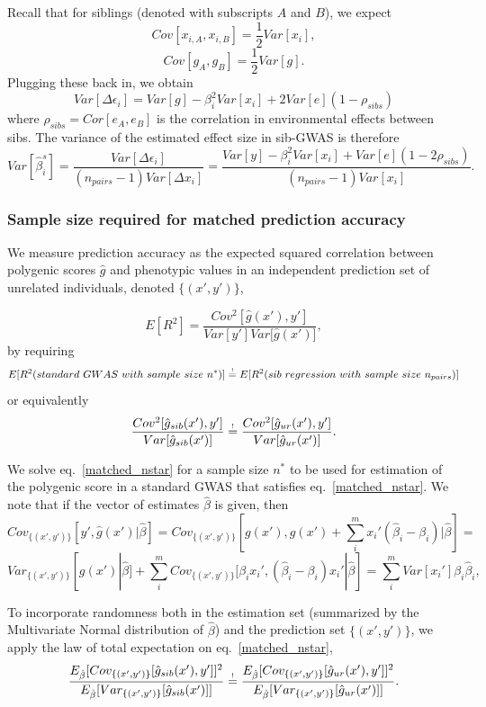 \documentclass[hidelinks, 12pt]{article}
\begin{document}
Recall that for siblings (denoted with subscripts $A$ and $B$), we expect
$$Cov[x_{i,A},x_{i,B}]=\frac{1}{2}Var[x_i],$$
$$Cov[g_A,g_B]=\frac{1}{2}Var[g].$$
Plugging these back in, we obtain
$$Var[\Delta \epsilon_i] = Var[g] - \beta_i^2Var[x_i] + 2Var[e](1-\rho_{sibs}) $$
where $\rho_{sibs} = Cor[e_A,e_B]$ is the correlation in environmental effects between sibs. The variance of the estimated effect size in sib-GWAS is therefore
\begin{equation}
\label{var_beta_hat_sibs}
Var[\hat{\beta}^{s}_i]=\frac{Var[\Delta \epsilon_i]}{(n_{pairs}-1) Var[\Delta x_i]} = \frac{Var[y] - \beta_i^2Var[x_i] + Var[e](1-2\rho_{sibs})}{(n_{pairs}-1) Var[x_i]}.
\end{equation}


\subsubsection{Sample size required for matched prediction accuracy}

We measure prediction accuracy as the expected squared correlation between polygenic scores $\hat{g}$ and phenotypic values in an independent prediction set of unrelated individuals, denoted $\{(x',y')\}$,

$$E[R^2] = \frac{Cov^2[\hat{g}(x'),y']}{{Var[y']Var[\hat{g}(x')}]},$$
by requiring 
\newcommand\reqeq{\mathrel{\stackrel{\makebox[0pt]{\mbox{\normalfont\tiny !}}}{=}}}
$$E[R^2(standard~GWAS~with~sample~size~n^*)] \reqeq E[R^2(sib~regression~with~sample~size~n_{pairs})]$$
or equivalently
\begin{equation}
\label{matched_nstar}
\frac{Cov^2[\hat{g}_{sib}(x'),y']}{{Var[\hat{g}_{sib}(x')]}} \reqeq \frac{Cov^2[\hat{g}_{ur}(x'),y']}{{Var[\hat{g}_{ur}(x')]}}.
\end{equation}

We solve eq.~\ref{matched_nstar} for a sample size $n^*$ to be used for estimation of the polygenic score in a standard GWAS that satisfies eq.~\ref{matched_nstar}.  We note that if the vector of estimates $\hat{\beta}$ is given, then
$$Cov_{\{(x',y')\}}[y',\hat{g}(x')|\hat{\beta}]=Cov_{\{(x',y')\}}[g(x'),g(x')+\sum_i^m{x_i'(\hat{\beta}_i-\beta_i)}|\hat{\beta}] = $$
\begin{equation}
\label{covgy_tag_simple}
Var_{\{(x',y')\}}[g(x')|\hat{\beta}]+\sum_i^m{Cov_{\{(x',y')\}}[\beta_ix_i',(\hat{\beta}_i-\beta_i)x_i'}|\hat{\beta}]=\sum_i^mVar[x_i']\beta_i\hat{\beta}_i,
\end{equation}

To incorporate randomness both in the estimation set (summarized by the Multivariate Normal distribution of $\hat{\beta}$) and the prediction set $\{(x',y')\}$, we apply the law of total expectation on eq.~\ref{matched_nstar}, 
\begin{equation}
\label{requirement_nstar_new}
\frac{E_{\hat{\beta}}[Cov_{\{(x',y')\}}[\hat{g}_{sib}(x'),y']]^2}{{E_{\hat{\beta}}[Var_{\{(x',y')\}}[\hat{g}_{sib}(x')]]}} \reqeq \frac{E_{\hat{\beta}}[Cov_{\{(x',y')\}}[\hat{g}_{ur}(x'),y']]^2}{{E_{\hat{\beta}}[Var_{\{(x',y')\}}[\hat{g}_{ur}(x')]]}}.
\end{equation}
\end{document}
